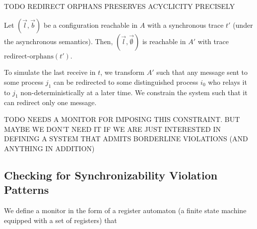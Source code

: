 TODO REDIRECT ORPHANS PRESERVES ACYCLICITY PRECISELY


\begin{lemma}
Let $(\vec{l},\vec{b})$ be a configuration reachable in $A$ with a synchronous trace $t'$ (under the asynchronous semantics). 
Then, $(\vec{l},\vec{\emptyset})$ is reachable in $A'$ with trace $\mathrm{redirect}\text{-}\mathrm{orphans}(t')$. 
\end{lemma}

To simulate the last receive in $t$, we transform $A'$ such that any message sent to some process $j_1$ can be redirected to some 
distinguished process $i_0$ who relays it to $j_1$ non-deterministically at a later time. We constrain the system such that it can
redirect only one message.



TODO NEEDS A MONITOR FOR IMPOSING THIS CONSTRAINT. BUT MAYBE WE DON'T NEED IT IF WE ARE JUST INTERESTED IN DEFINING A SYSTEM THAT ADMITS BORDERLINE VIOLATIONS (AND ANYTHING IN ADDITION)




\subsection{Checking for Synchronizability Violation Patterns}

We define a monitor in the form of a register automaton (a finite state machine equipped with a set of registers)
that 